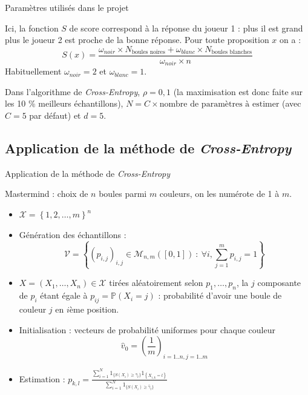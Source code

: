 \documentclass[10pt,xcolor=table,color={dvipsnames,usenames},ignorenonframetext,usepdftitle=false,french]{beamer}
\begin{document}
\begin{frame}{Paramètres utilisés dans le projet}

Ici, la fonction \(S\) de score correspond à la réponse du joueur 1 :
plus il est grand plus le joueur 2 est proche de la bonne réponse. Pour
toute proposition \(x\) on a : \[
S(x)=\frac{\omega_{noir}\times N_{\text{boules noires}}+\omega_{blanc}\times N_{\text{boules blanches}}
}{
\omega_{noir}\times n
}
\] Habituellement \(\omega_{noir}=2\) et \(\omega_{blanc}=1\).

Dans l'algorithme de \emph{Cross-Entropy}, \(\rho = 0,1\) (la
maximisation est donc faite sur les 10 \% meilleurs échantillons),
\(N = C\times\text{nombre de paramètres à estimer}\) (avec \(C=5\) par
défaut) et \(d=5\).

\end{frame}

\subsection{\texorpdfstring{Application de la méthode de
\emph{Cross-Entropy}}{Application de la méthode de Cross-Entropy}}\label{application-de-la-muxe9thode-de-cross-entropy}

\begin{frame}{Application de la méthode de \emph{Cross-Entropy}}

Mastermind : choix de \(n\) boules parmi \(m\) couleurs, on les numérote
de 1 à \(m\).

\begin{itemize}
\item $\mathcal{X}=\left\{ 1,2,\dots,m\right\}^{n}$  
\item Génération des échantillons : $$\mathcal{V} = \left\{ \left(p_{i,j}\right)_{i,j} \in\mathcal{M}_{n,m}([0,1])\::\:\forall i,\sum_{j=1}^mp_{i,j}=1\right\} $$
\item $X=(X_{1},\dots,X_{n})\in\mathcal{X}$ tirées aléatoirement selon $p_{1},\dots,p_{n}$, la $j$ \ieme composante de $p_{i}$ étant égale à $p_{ij}=\mathbb{P}(X_{i}=j)$ : probabilité d'avoir une boule de couleur $j$ en $i$ème position.
\item Initialisation : vecteurs de probabilité uniformes pour chaque couleur
$$
\hat{v}_{0}=\left(\frac{1}{m}\right)_{i=1..n,j=1..m}
$$
\item Estimation : $p_{k,l}=\frac{\sum_{i=1}^{N}1_{\{S(X_{i})\geq\hat{\gamma}_{t}\}}1_{\left\{ X_{i,k}=l\right\} }}{\sum_{i=1}^{N}1_{\{S(X_{i})\geq\hat{\gamma}_{t}\}}}$
\end{itemize}

\end{frame}
\end{document}
